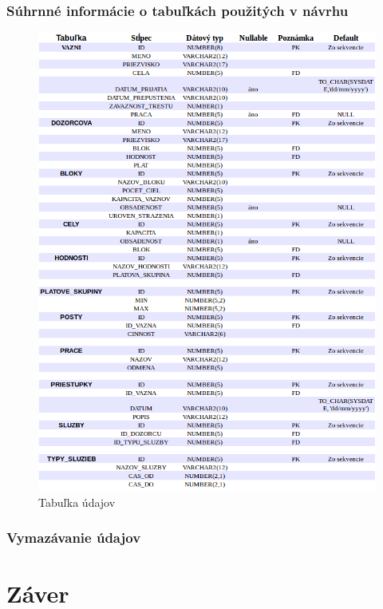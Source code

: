 \documentclass[slovak, 12pt, Times New Roman]{article}
\begin{document}
			\subsubsection{Súhrnné informácie o tabuľkách použitých v návrhu}
				\begin{figure}[!htb]
				\centering
				\includegraphics[scale=0.6]{suhrnneInfo.png}
				\caption{Tabuľka údajov}
				\label{fig:Reinforcement}
			\end{figure}
			\clearpage
			\subsubsection{Vymazávanie údajov}
	\section{Záver}
\end{document}
